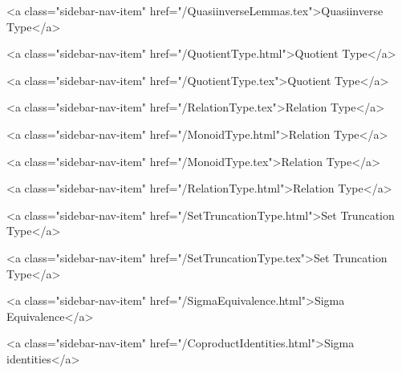       
    
      
        
          <a class="sidebar-nav-item" href="/QuasiinverseLemmas.tex">Quasiinverse Type</a>
        
      
    
      
        
          <a class="sidebar-nav-item" href="/QuotientType.html">Quotient Type</a>
        
      
    
      
        
          <a class="sidebar-nav-item" href="/QuotientType.tex">Quotient Type</a>
        
      
    
      
        
          <a class="sidebar-nav-item" href="/RelationType.tex">Relation Type</a>
        
      
    
      
        
          <a class="sidebar-nav-item" href="/MonoidType.html">Relation Type</a>
        
      
    
      
        
          <a class="sidebar-nav-item" href="/MonoidType.tex">Relation Type</a>
        
      
    
      
        
          <a class="sidebar-nav-item" href="/RelationType.html">Relation Type</a>
        
      
    
      
        
          <a class="sidebar-nav-item" href="/SetTruncationType.html">Set Truncation Type</a>
        
      
    
      
        
          <a class="sidebar-nav-item" href="/SetTruncationType.tex">Set Truncation Type</a>
        
      
    
      
        
          <a class="sidebar-nav-item" href="/SigmaEquivalence.html">Sigma Equivalence</a>
        
      
    
      
        
          <a class="sidebar-nav-item" href="/CoproductIdentities.html">Sigma identities</a>
        
